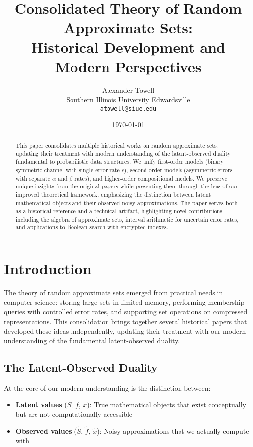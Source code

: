 \documentclass[11pt]{article}
\title{Consolidated Theory of Random Approximate Sets:\\
Historical Development and Modern Perspectives}
\author{Alexander Towell\\
Southern Illinois University Edwardsville\\
\texttt{atowell@siue.edu}}
\date{\today}
\newcommand{\observed}[1]{\tilde{#1}}  %
\newcommand{\fprate}{\alpha}  %
\newcommand{\fnrate}{\beta}   %
\begin{document}
\maketitle

\begin{abstract}
This paper consolidates multiple historical works on random approximate sets, updating their treatment with modern understanding of the latent-observed duality fundamental to probabilistic data structures. We unify first-order models (binary symmetric channel with single error rate $\epsilon$), second-order models (asymmetric errors with separate $\fprate$ and $\fnrate$ rates), and higher-order compositional models. We preserve unique insights from the original papers while presenting them through the lens of our improved theoretical framework, emphasizing the distinction between latent mathematical objects and their observed noisy approximations. The paper serves both as a historical reference and a technical artifact, highlighting novel contributions including the algebra of approximate sets, interval arithmetic for uncertain error rates, and applications to Boolean search with encrypted indexes.
\end{abstract}

\tableofcontents

\section{Introduction}
\label{sec:intro}

The theory of random approximate sets emerged from practical needs in computer science: storing large sets in limited memory, performing membership queries with controlled error rates, and supporting set operations on compressed representations. This consolidation brings together several historical papers that developed these ideas independently, updating their treatment with our modern understanding of the fundamental latent-observed duality.

\subsection{The Latent-Observed Duality}

At the core of our modern understanding is the distinction between:
\begin{itemize}
\item \textbf{Latent values} ($S$, $f$, $x$): True mathematical objects that exist conceptually but are not computationally accessible
\item \textbf{Observed values} ($\observed{S}$, $\observed{f}$, $\observed{x}$): Noisy approximations that we actually compute with
\end{itemize}
\end{document}

